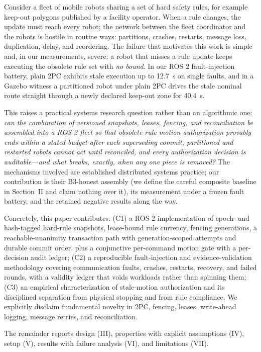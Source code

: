 \documentclass[10pt,journal]{IEEEtran}
\begin{document}
Consider a fleet of mobile robots sharing a set of hard safety rules,
for example keep-out polygons published by a facility operator. When
a rule changes, the update must reach every robot; the network between
the fleet coordinator and the robots is hostile in routine ways:
partitions, crashes, restarts, message loss, duplication, delay, and
reordering. The failure that motivates this work is simple and, in
our measurements, severe: a robot that misses a rule update keeps
executing the obsolete rule set with \emph{no bound}. In our ROS 2
fault-injection battery, plain 2PC exhibits stale execution up to
12.7~s on single faults, and in a Gazebo witness a partitioned robot
under plain 2PC drives the stale nominal route straight through a
newly declared keep-out zone for 40.4~s.

This raises a practical systems research question rather than an
algorithmic one: \emph{can the combination of versioned snapshots,
leases, fencing, and reconciliation be assembled into a ROS 2 fleet
so that obsolete-rule motion authorization provably ends within a
stated budget after each superseding commit, partitioned and
restarted robots cannot act until reconciled, and every authorization
decision is auditable---and what breaks, exactly, when any one piece
is removed?} The mechanisms involved are established distributed
systems practice; our contribution is their B3-honest assembly (we
define the careful composite baseline in Section~II and claim nothing
over it), its measurement under a frozen fault battery, and the
retained negative results along the way.

Concretely, this paper contributes: (C1) a ROS 2 implementation of
epoch- and hash-tagged hard-rule snapshots, lease-bound rule
currency, fencing generations, a reachable-unanimity transaction
path with generation-scoped attempts and durable commit order, plus a
conjunctive per-command motion gate with a per-decision audit ledger;
(C2) a reproducible fault-injection and evidence-validation
methodology covering communication faults, crashes, restarts,
recovery, and failed rounds, with a validity ledger that voids
workloads rather than spinning them; (C3) an empirical
characterization of stale-motion authorization and its disciplined
separation from physical stopping and from rule compliance. We
explicitly disclaim fundamental novelty in 2PC, fencing, leases,
write-ahead logging, message retries, and reconciliation.

The remainder reports design (III), properties with explicit
assumptions (IV), setup (V), results with failure analysis (VI),
and limitations (VII).
\end{document}
